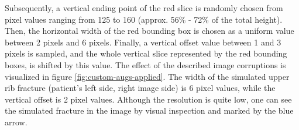 Subsequently, a vertical ending point of the red slice is randomly chosen from pixel values ranging from 125 to 160 (approx. 56\% - 72\% of the total height).
Then, the horizontal width of the red bounding box is chosen as a uniform value between 2 pixels and 6 pixels.
Finally, a vertical offset value between 1 and 3 pixels is sampled, and the whole vertical slice represented by the red bounding boxes, is shifted by this value.
The effect of the described image corruptions is visualized in figure \ref{fig:custom-augs-applied}.
The width of the simulated upper rib fracture (patient's left side, right image side) is 6 pixel values, while the vertical offset is 2 pixel values.
Although the resolution is quite low, one can see the simulated fracture in the image by visual inspection and marked by the blue arrow.
